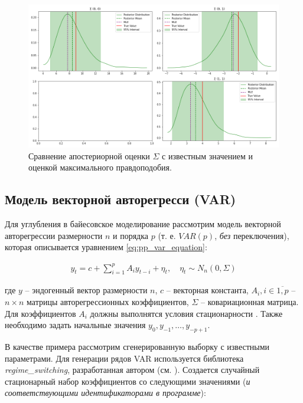 \documentclass[a4paper,14pt]{extreport}
\begin{document}
\begin{figure}[H]
	\includegraphics[width=\linewidth]{img/gen/pp_mvn_sigma_hdi.png}
	\caption{Сравнение апостериорной оценки $\Sigma$ с известным значением и оценкой максимального правдоподобия. }
	\label{fig:pp_mvn_sigma_hdi}
\end{figure}


\subsection{Модель векторной авторегресси (VAR)}

\label{subsection:var}

Для углубления в байесовское моделирование рассмотрим модель векторной авторегрессии размерности $n$ и порядка $p$ (т. е. $VAR(p)$, \textit{без} переключения), которая описывается уравнением \eqref{eq:pp_var_equation}:

\begin{equation}
	\begin{multlined}
		y_t = c + \sum\limits_{i=1}^{p}{A_{i}y_{t-i}} + \eta_t , 
		\quad
		\eta_t \sim N_n(0, \Sigma)
	\end{multlined}
	\label{eq:pp_var_equation}
\end{equation}

\noindent
где $y$ -- эндогенный вектор размерности $n$, $c$ -- векторная константа, $A_i, i\in\overline{1,p}$ -- $n \times n$ матрицы авторегрессионных коэффициентов, $\Sigma$ -- ковариационная матрица. Для коэффициентов $A_i$ должны выполнятся условия стационарности \cite{mal_multidim_nonhomogenous}. Также необходимо задать начальные значения ${y_{0}, y_{-1}, \dots, y_{-p+1}}$. 

В качестве примера рассмотрим сгенерированную выборку с известными параметрами. Для генерации рядов VAR используется библиотека \textit{regime\_switching}, разработанная автором (см. ). Создается случайный стационарный набор коэффициентов со следующими значениями (\textit{и соответствующими идентификаторами в программе}):
\end{document}
